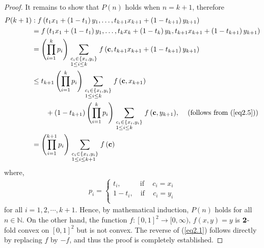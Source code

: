 \documentclass{amsart}
\theoremstyle{plain}
\numberwithin{equation}{section}
\begin{document}
\begin{proof}
It remains to show that $P(n)$ holds when $n=k+1$, therefore
\begin{align*}
P(k+1)&: f\left( {t_1 x_1  + \left( {1 - t_1 } \right)y_1 , \ldots
,t_{k + 1} x_{k + 1}  + \left( {1 - t_{k + 1} } \right)y_{k + 1} }
\right)
\\
&= f\left( {t_1 x_1  + \left( {1 - t_1 } \right)y_1 , \ldots ,t_k
x_k  + \left( {1 - t_k } \right)y_k ,t_{k + 1} x_{k + 1}  + \left(
{1 - t_{k + 1} } \right)y_{k + 1} } \right)
  \\
&= \left( {\prod\limits_{i = 1}^k {p_i } }
\right)\sum\limits_{\scriptstyle c_i  \in \left\{ {x_i ,y_i }
\right\} \hfill \atop
  \scriptstyle 1 \le i \le k \hfill} {f\left( {{\bf{c}},t_{k + 1} x_{k + 1}  + \left(
{1 - t_{k + 1} } \right)y_{k + 1}} \right)}
\\
&\le t_{k+1} \left( {\prod\limits_{i = 1}^k {p_i } }
\right)\sum\limits_{\scriptstyle c_i  \in \left\{ {x_i ,y_i }
\right\} \hfill \atop
  \scriptstyle 1 \le i \le k \hfill} {f\left( {{\bf{c}},x_{k + 1}} \right)}
\\
&\qquad+\left( {1 - t_{k + 1} } \right) \left( {\prod\limits_{i =
1}^k {p_i } } \right)\sum\limits_{\scriptstyle c_i  \in \left\{
{x_i ,y_i } \right\} \hfill \atop
  \scriptstyle 1 \le i \le k \hfill} {f\left( {{\bf{c}},y_{k + 1}} \right)}
,\,\,\,\,\,\,\,\text{(follows from (\ref{eq2.5}))}
  \\
&= \left( {\prod\limits_{i = 1}^{k + 1} {p_i } }
\right)\sum\limits_{\scriptstyle c_i  \in \left\{ {x_i ,y_i }
\right\} \hfill \atop
  \scriptstyle 1 \le i \le k+1 \hfill} {f\left( {\bf{c}} \right)}
\end{align*}
where,
\begin{align*}
p_i  = \left\{ \begin{array}{l}
 t_i ,\,\,\,\,\,\,\,\,\,\,\,\,\,\,\,\,\text{if}\,\,\,\,\,\,\,c_i  = x_i  \\
 1 - t_i ,\,\,\,\,\,\,\text{if}\,\,\,\,\,\,\,c_i  = y_i  \\
 \end{array} \right.
\end{align*}
for all $i=1,2,\cdots, k+1$. Hence, by mathematical induction,
$P(n)$ holds for all $n \in \mathrm{}\mathbb{N}$. On the other
hand, the function $f:[0,1]^2 \to [0,\infty)$, $f(x,y)=y$ is
${\bf{2}}$-fold convex on $[0,1]^2 $ but is not convex. The
reverse of (\ref{eq2.1}) follows directly by replacing $f$ by
$-f$, and thus the proof is completely established.
\end{proof}
\end{document}
